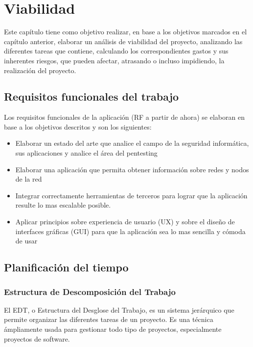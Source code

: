 \chapter{Viabilidad}
Este capítulo tiene como objetivo realizar, en base a los objetivos marcados en el capítulo anterior, elaborar un análisis de viabilidad del proyecto, analizando las diferentes tareas que contiene, calculando los correspondientes gastos y sus inherentes riesgos, que pueden afectar, atrasando o incluso impidiendo, la realización del proyecto.

\section{Requisitos funcionales del trabajo}
Los requisitos funcionales de la aplicación (RF a partir de ahora) se elaboran en base a los objetivos descritos y son los siguientes:

\begin{itemize}
	\item Elaborar un estado del arte que analice el campo de la seguridad informática, sus aplicaciones y analice el área del pentesting
	\item Elaborar una aplicación que permita obtener información sobre redes y nodos de la red
	\item Integrar correctamente herramientas de terceros para lograr que la aplicación resulte lo mas escalable posible.
	\item Aplicar principios sobre experiencia de usuario (UX) y sobre el diseño de interfaces gráficas (GUI) para que la aplicación sea lo mas sencilla y cómoda de usar
\end{itemize}




\section{Planificación del tiempo}

\subsection[EDT]{Estructura de Descomposición del Trabajo}
El EDT, o Estructura del Desglose del Trabajo, es un sistema jerárquico que permite organizar las diferentes tareas de un proyecto. Es una técnica ámpliamente usada para gestionar todo tipo de proyectos, especialmente proyectos de software.

